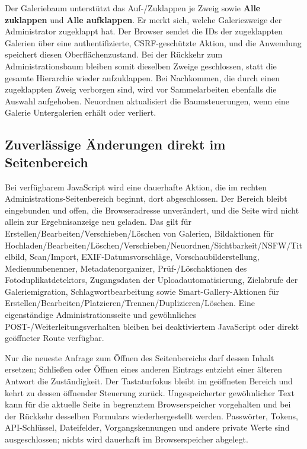 \documentclass[11pt,a4paper]{article}
\newcommand{\ui}[1]{\textbf{#1}}
\begin{document}
Der Galeriebaum unterstützt das Auf-/Zuklappen je Zweig sowie \ui{Alle
zuklappen} und \ui{Alle aufklappen}. Er merkt sich, welche Galeriezweige der
Administrator zugeklappt hat. Der Browser sendet die IDs der zugeklappten
Galerien über eine authentifizierte, CSRF-geschützte Aktion, und die Anwendung
speichert diesen Oberflächenzustand. Bei der Rückkehr zum Administrationsbaum
bleiben somit dieselben Zweige geschlossen, statt die gesamte Hierarchie wieder
aufzuklappen. Bei Nachkommen, die durch einen zugeklappten Zweig verborgen sind,
wird vor Sammelarbeiten ebenfalls die Auswahl aufgehoben. Neuordnen aktualisiert
die Baumsteuerungen, wenn eine Galerie Untergalerien erhält oder verliert.

\subsection{Zuverlässige Änderungen direkt im Seitenbereich}

Bei verfügbarem JavaScript wird eine dauerhafte Aktion, die im rechten
Administrations-Seitenbereich beginnt, dort abgeschlossen. Der Bereich bleibt
eingebunden und offen, die Browseradresse unverändert, und die Seite wird nicht
allein zur Ergebnisanzeige neu geladen. Das gilt für
Erstellen/Bearbeiten/Verschieben/Löschen von Galerien, Bildaktionen für
Hochladen/Bearbeiten/Löschen/Verschieben/Neuordnen/Sichtbarkeit/NSFW/Titelbild,
Scan/Import, EXIF-Datumsvorschläge, Vorschaubilderstellung, Medienumbenenner,
Metadatenorganizer, Prüf-/Löschaktionen des Fotoduplikatdetektors, Zugangsdaten
der Uploadautomatisierung, Zielabrufe der Galeriemigration,
Schlagwortbearbeitung sowie Smart-Gallery-Aktionen für
Erstellen/Bearbeiten/Platzieren/Trennen/Duplizieren/Löschen. Eine eigenständige
Administrationsseite und gewöhnliches POST-/Weiterleitungsverhalten bleiben bei
deaktiviertem JavaScript oder direkt geöffneter Route verfügbar.

Nur die neueste Anfrage zum Öffnen des Seitenbereichs darf dessen Inhalt
ersetzen; Schließen oder Öffnen eines anderen Eintrags entzieht einer älteren
Antwort die Zuständigkeit. Der Tastaturfokus bleibt im geöffneten Bereich und
kehrt zu dessen öffnender Steuerung zurück. Ungespeicherter gewöhnlicher Text
kann für die aktuelle Seite in begrenztem Browserspeicher vorgehalten und bei
der Rückkehr desselben Formulars wiederhergestellt werden. Passwörter, Tokens,
API-Schlüssel, Dateifelder, Vorgangskennungen und andere private Werte sind
ausgeschlossen; nichts wird dauerhaft im Browserspeicher abgelegt.
\end{document}

